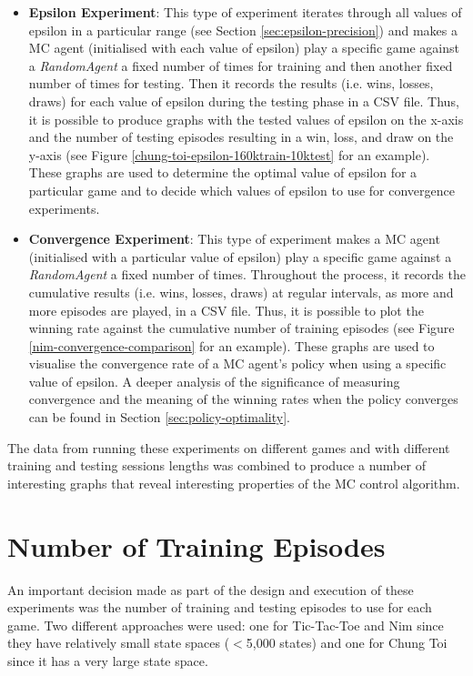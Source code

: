 \documentclass[11pt,a4paper]{report}
\begin{document}
\begin{itemize}

	\item \textbf{Epsilon Experiment}: This type of experiment iterates through all values of epsilon in a particular range (see Section \ref{sec:epsilon-precision}) and makes a MC agent (initialised with each value of epsilon) play a specific game against a \emph{RandomAgent} a fixed number of times for training and then another fixed number of times for testing. Then it records the results (i.e. wins, losses, draws) for each value of epsilon during the testing phase in a CSV file. Thus, it is possible to produce graphs with the tested values of epsilon on the x-axis and the number of testing episodes resulting in a win, loss, and draw on the y-axis (see Figure \ref{chung-toi-epsilon-160ktrain-10ktest} for an example). These graphs are used to determine the optimal value of epsilon for a particular game and to decide which values of epsilon to use for convergence experiments.

	\item \textbf{Convergence Experiment}: This type of experiment makes a MC agent (initialised with a particular value of epsilon) play a specific game against a \emph{RandomAgent} a fixed number of times. Throughout the process, it records the cumulative results (i.e. wins, losses, draws) at regular intervals, as more and more episodes are played, in a CSV file. Thus, it is possible to plot the winning rate against the cumulative number of training episodes (see Figure \ref{nim-convergence-comparison} for an example). These graphs are used to visualise the convergence rate of a MC agent's policy when using a specific value of epsilon. A deeper analysis of the significance of measuring convergence and the meaning of the winning rates when the policy converges can be found in Section \ref{sec:policy-optimality}.

\end{itemize}

The data from running these experiments on different games and with different training and testing sessions lengths was combined to produce a number of interesting graphs that reveal interesting properties of the MC control algorithm.


\section{Number of Training Episodes}

An important decision made as part of the design and execution of these experiments was the number of training and testing episodes to use for each game. Two different approaches were used: one for Tic-Tac-Toe and Nim since they have relatively small state spaces ($<$5,000 states) and one for Chung Toi since it has a very large state space.
\end{document}
